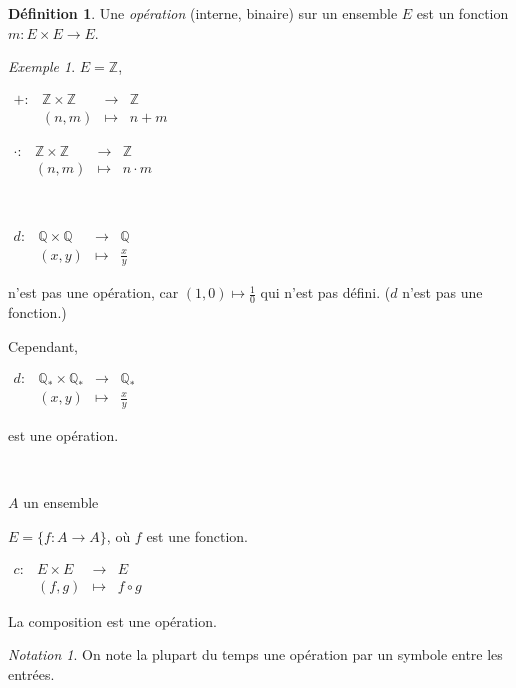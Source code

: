 \documentclass{report}
\newcommand*{\entiers}{\mathbb{Z}}
\newcommand*{\rationels}{\mathbb{Q}}
\theoremstyle{definition}
\newtheorem*{defin}{D\'efinition}
\theoremstyle{remark}
\newtheorem*{exem}{Exemple}
\newtheorem*{nota}{Notation}
\begin{document}
	\begin{defin}
		Une \emph{op\'eration} (interne, binaire) sur un ensemble $E$ est un fonction $m:E \times E \to E$.
	\end{defin}

	\begin{exem}
		$E=\entiers$,

		$\begin{array}{rrcl}
			+:&\entiers \times \entiers &\longrightarrow& \entiers\\
			&(n,m)&\longmapsto&n + m
		\end{array}$

		$\begin{array}{rrcl}
			\cdot:&\entiers \times \entiers &\longrightarrow& \entiers\\
			&(n,m)&\longmapsto&n \cdot m
		\end{array}$

		~

		$\begin{array}{rrcl}
			d:&\rationels \times \rationels&\longrightarrow&\rationels\\
			&(x,y)&\longmapsto&\frac{x}{y}
		\end{array}$

		n'est pas une op\'eration, car $(1,0) \mapsto \frac{1}{0}$ qui n'est pas d\'efini. ($d$ n'est pas une fonction.)

		Cependant,

		$\begin{array}{rrcl}
			d:&\rationels_* \times \rationels_*&\longrightarrow&\rationels_*\\
			&(x,y)&\longmapsto&\frac{x}{y}
		\end{array}$

		est une op\'eration.

		~

		$A$ un ensemble

		$E=\{f:A \to A\}$, o\`u $f$ est une fonction.

		$\begin{array}{rrcl}
			c:&E \times E&\longrightarrow&E\\
			&(f,g)&\longmapsto&f \circ g
		\end{array}$

		La composition est une op\'eration.
	\end{exem}

	\begin{nota}
		On note la plupart du temps une op\'eration par un symbole entre les entr\'ees.
	\end{nota}
\end{document}

